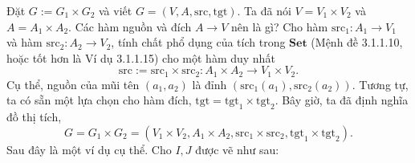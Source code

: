 Đặt $G:=G_1\times G_2$ và viết $G=(V,A,\mathrm{src},\mathrm{tgt})$. Ta đã nói $V=V_1\times V_2$ và $A=A_1\times A_2$. Các hàm nguồn và đích $A\to V$ nên là gì? Cho hàm $\mathrm{src}_1:A_1\to V_1$ và hàm $\mathrm{src}_2:A_2\to V_2$, tính chất phổ dụng của tích trong $\mathbf{Set}$ (Mệnh đề 3.1.1.10, hoặc tốt hơn là Ví dụ 3.1.1.15) cho một hàm duy nhất
\[\mathrm{src}:=\mathrm{src}_1\times\mathrm{src}_2:A_1\times A_2\to V_1\times V_2.\]
Cụ thể, nguồn của mũi tên $(a_1,a_2)$ là đỉnh $(\mathrm{src}_1(a_1),\mathrm{src}_2(a_2))$. Tương tự, ta có sẵn một lựa chọn cho hàm đích, $\mathrm{tgt}=\mathrm{tgt}_1\times\mathrm{tgt}_2$. Bây giờ, ta đã định nghĩa đồ thị tích,
\[G=G_1\times G_2=(V_1\times V_2,A_1\times A_2,\mathrm{src}_1\times\mathrm{src}_2,\mathrm{tgt}_1\times\mathrm{tgt}_2).\]
Sau đây là một ví dụ cụ thể. Cho $I,J$ được vẽ như sau:
\begin{center}\end{center}
